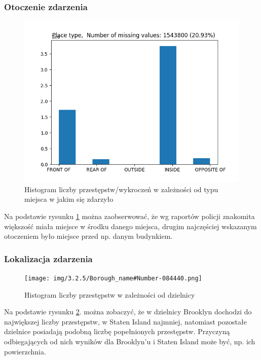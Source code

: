 \documentclass{classrep}
\begin{document}
{{            \subsubsection{Otoczenie zdarzenia} {
                \begin{figure}[!htbp]
                    \centering
                    \includegraphics[width=\textwidth]{img/Placetype-133640.png}
                    \caption{Histogram liczby przestępstw/wykroczeń w zależności od typu miejsca w jakim się zdarzyło}
                    \label{hist_place_type}
                \end{figure}
                \FloatBarrier
                Na podstawie rysunku \ref{hist_place_type} można zaobserwować, że wg
                raportów policji znakomita większość miała miejsce w środku danego
                miejsca, drugim najczęściej wskazanym otoczeniem było miejsce przed np.
                danym budynkiem.
            }

            \subsubsection{Lokalizacja zdarzenia} {
                \begin{figure}[!htbp]
                    \centering
                   \texttt{[image: img/3.2.5/Borough\_name\#Number-084440.png]}
                    \caption{Histogram liczby przestępstw w zależności od dzielnicy}
                    \label{borough_hist}
                \end{figure}
                \FloatBarrier
                Na podstawie rysunku \ref{borough_hist}. można zobaczyć, że w dzielnicy
                Brooklyn dochodzi do największej liczby przestępstw, w Staten Island
                najmniej, natomiast pozostałe dzielnice posiadają podobną liczbę
                popełnionych przestępstw. Przyczyną odbiegających od nich wyników dla
                Brooklyn'u i Staten Island może być, np. ich powierzchnia.
            }

}}
\end{document}
